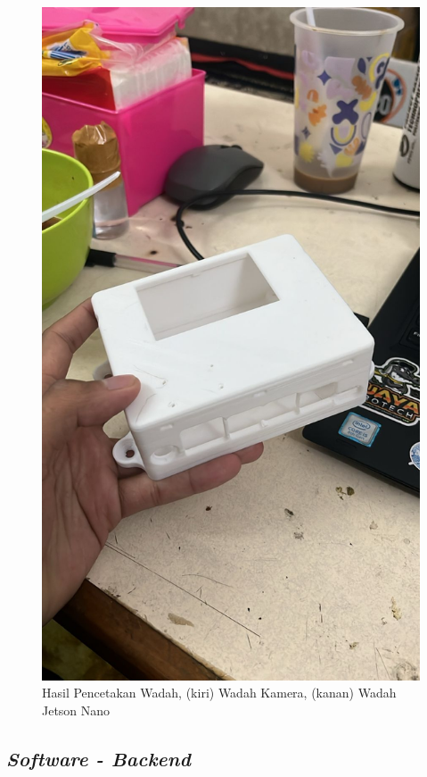 \begin{figure}
  \includegraphics[scale=0.15]{gambar/bab3-case-jnano-printed.jpeg}

  \caption{\centering Hasil Pencetakan Wadah, (kiri) Wadah Kamera, (kanan) Wadah Jetson Nano}
  \label{fig:printcontainer}
\end{figure}

\subsection{\emph{Software - Backend}}

